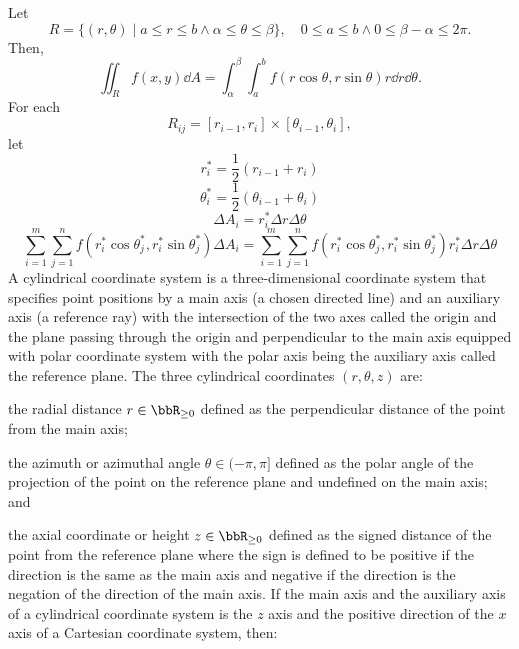 Let
\[R=\{(r,\theta)\mid a\le r\le b\land\alpha\le\theta\le\beta\},\quad0\le a\le b\land0\le\beta-\alpha\le 2\pi.\]
Then,
\[\iint_Rf(x,y)\dd{A}=\int_{\alpha}^{\beta}\int_a^bf(r\cos\theta,r\sin\theta)r\dd{r}\dd{\theta}.\]
\bpr
For each
\[R_{ij}=[r_{i-1},r_i]\times[\theta_{i-1},\theta_i],\]
let
\[r_i^*=\frac{1}{2}(r_{i-1}+r_i)\]
\[\theta_i^*=\frac{1}{2}(\theta_{i-1}+\theta_i)\]
\[\Delta A_i=r_i^*\Delta r\Delta\theta\]
\[\sum_{i=1}^m\sum_{j=1}^nf(r_i^*\cos\theta_j^*,r_i^*\sin\theta_j^*)\Delta A_i=\sum_{i=1}^m\sum_{j=1}^nf(r_i^*\cos\theta_j^*,r_i^*\sin\theta_j^*)r_i^*\Delta r\Delta\theta\]
\epr
{}
A cylindrical coordinate system is a three-dimensional coordinate system that specifies point positions by a main axis (a chosen directed line) and an auxiliary axis (a reference ray) with the intersection of the two axes called the origin and the plane passing through the origin and perpendicular to the main axis equipped with polar coordinate system with the polar axis being the auxiliary axis called the reference plane. The three cylindrical coordinates $(r,\theta,z)$ are:
\bit
\item the radial distance $r\in\bbR_{\geq 0}$ defined as the perpendicular distance of the point from the main axis;
\item the azimuth or azimuthal angle $\theta\in(-\pi,\pi]$ defined as the polar angle of the projection of the point on the reference plane and undefined on the main axis; and
\item the axial coordinate or height $z\in\bbR_{\geq 0}$ defined as the signed distance of the point from the reference plane where the sign is defined to be positive if the direction is the same as the main axis and negative if the direction is the negation of the direction of the main axis.
\eit
{}
If the main axis and the auxiliary axis of a cylindrical coordinate system is the $z$ axis and the positive direction of the $x$ axis of a Cartesian coordinate system, then:

